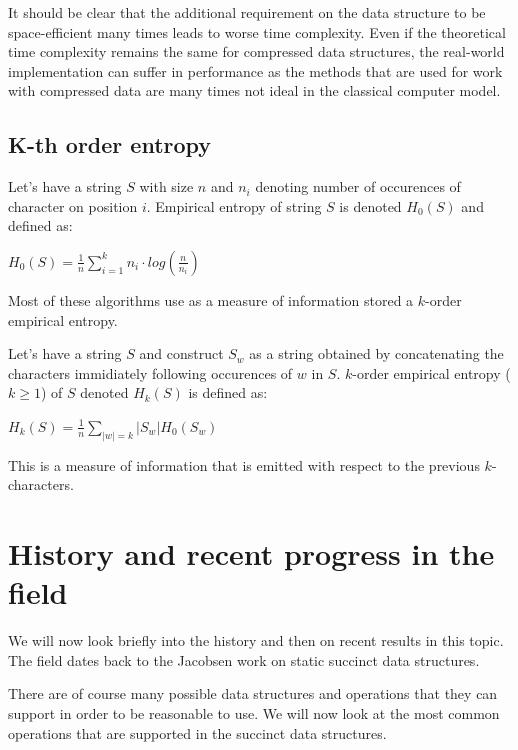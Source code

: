 It should be clear that the additional requirement on the data structure to be space-efficient many times leads to worse time complexity. Even if the theoretical time complexity remains the same for compressed data structures, the real-world implementation can suffer in performance as the methods that are used for work with compressed data are many times not ideal in the classical computer model.

\subsection{K-th order entropy}

\begin{theorem}
Let's have a string $S$ with size $n$ and $n_i$ denoting number of occurences of character
on position $i$. Empirical entropy of string $S$ is denoted $H_0(S)$ and defined as:
\begin{center}
$H_0(S) = \frac{1}{n} \sum_{i=1}^{k} n_i\cdot log(\frac{n}{n_i})$
\end{center}
\end{theorem}

Most of these algorithms use as a measure of information stored a $k$-order empirical entropy.

\begin{theorem}
Let's have a string $S$ and construct $S_w$ as a string obtained by concatenating the characters immidiately following occurences of $w$ in $S$.
$k$-order empirical entropy ($k \geq 1$) of $S$ denoted $H_k(S)$ is defined as:
\begin{center}
$H_k(S) = \frac{1}{n} \sum_{|w|=k} |S_w| H_0(S_w)$
\end{center}
\end{theorem}

This is a measure of information that is emitted with respect to the previous $k$-characters.

\section{History and recent progress in the field}

We will now look briefly into the history and then on recent results in this topic. The field dates back to the Jacobsen work on static succinct data structures.

There are of course many possible data structures and operations that they can support in order to be reasonable to use. We will now look at the most common operations that are supported in the succinct data structures.

